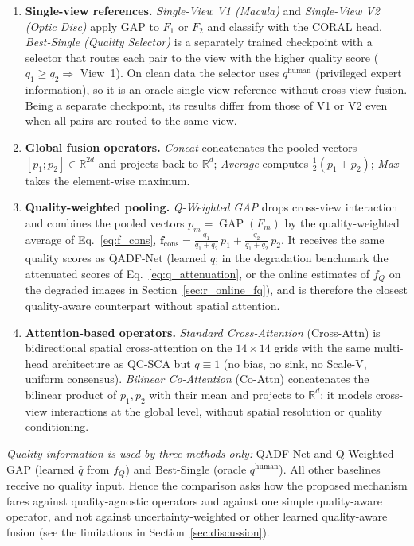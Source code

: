 \documentclass[final,5p,times,twocolumn,authoryear]{elsarticle}
\newcommand{\qadfnet}{QADF-Net}
\newcommand{\qcsca}{QC-SCA}
\theoremstyle{plain}
\theoremstyle{remark}
\begin{document}
\begin{enumerate}
  \item \textbf{Single-view references.} \emph{Single-View V1 (Macula)} and \emph{Single-View V2 (Optic Disc)} apply GAP to $F_1$ or $F_2$ and classify with the CORAL head. \emph{Best-Single (Quality Selector)} is a separately trained checkpoint with a selector that routes each pair to the view with the higher quality score ($q_1 \ge q_2 \Rightarrow$ View~1). On clean data the selector uses $q^{\text{human}}$ (privileged expert information), so it is an oracle single-view reference without cross-view fusion. Being a separate checkpoint, its results differ from those of V1 or V2 even when all pairs are routed to the same view.
  \item \textbf{Global fusion operators.} \emph{Concat} concatenates the pooled vectors $[p_1;p_2]\in\mathbb{R}^{2d}$ and projects back to $\mathbb{R}^d$; \emph{Average} computes $\tfrac12(p_1+p_2)$; \emph{Max} takes the element-wise maximum.
  \item \textbf{Quality-weighted pooling.} \emph{Q-Weighted GAP} drops cross-view interaction and combines the pooled vectors $p_m=\operatorname{GAP}(F_m)$ by the quality-weighted average of Eq.~\eqref{eq:f_cons}, $\mathbf{f}_{\text{cons}} = \tfrac{q_1}{q_1+q_2}\,p_1 + \tfrac{q_2}{q_1+q_2}\,p_2$. It receives the same quality scores as \qadfnet{} (learned $\hat q$; in the degradation benchmark the attenuated scores of Eq.~\eqref{eq:q_attenuation}, or the online estimates of $f_Q$ on the degraded images in Section~\ref{sec:r_online_fq}), and is therefore the closest quality-aware counterpart without spatial attention.
  \item \textbf{Attention-based operators.} \emph{Standard Cross-Attention} (Cross-Attn) is bidirectional spatial cross-attention on the $14\times14$ grids with the same multi-head architecture as \qcsca{} but $q\equiv1$ (no bias, no sink, no Scale-V, uniform consensus). \emph{Bilinear Co-Attention} (Co-Attn) \citep{Lu2019coattn,Kim2021coattn} concatenates the bilinear product of $p_1,p_2$ with their mean and projects to $\mathbb{R}^d$; it models cross-view interactions at the global level, without spatial resolution or quality conditioning.
\end{enumerate}
\emph{Quality information is used by three methods only:} \qadfnet{} and Q-Weighted GAP (learned $\hat q$ from $f_Q$) and Best-Single (oracle $q^{\text{human}}$). All other baselines receive no quality input. Hence the comparison asks how the proposed mechanism fares against quality-agnostic operators and against one simple quality-aware operator, and not against uncertainty-weighted or other learned quality-aware fusion (see the limitations in Section~\ref{sec:discussion}).
\end{document}
